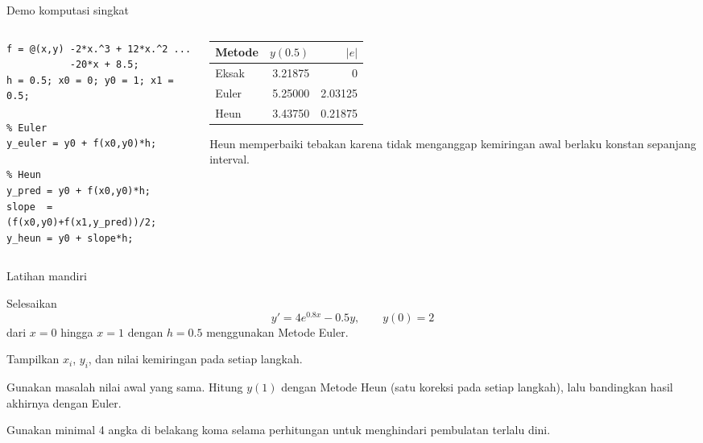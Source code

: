 \documentclass[aspectratio=169,10pt]{beamer}
\begin{document}
\begin{frame}[fragile]{Demo komputasi singkat}
\scriptsize
\begin{columns}[T,totalwidth=\textwidth]
\begin{column}{.55\textwidth}
\begin{lstlisting}[style=matlabstyle]
f = @(x,y) -2*x.^3 + 12*x.^2 ...
           -20*x + 8.5;
h = 0.5; x0 = 0; y0 = 1; x1 = 0.5;

% Euler
y_euler = y0 + f(x0,y0)*h;

% Heun
y_pred = y0 + f(x0,y0)*h;
slope  = (f(x0,y0)+f(x1,y_pred))/2;
y_heun = y0 + slope*h;
\end{lstlisting}
\end{column}
\begin{column}{.41\textwidth}
\begin{bluebox}
\begin{center}
\begin{tabular}{lrr}
\toprule
Metode & $y(0.5)$ & $|e|$\\
\midrule
Eksak & 3.21875 & 0\\
Euler & 5.25000 & 2.03125\\
Heun & 3.43750 & 0.21875\\
\bottomrule
\end{tabular}
\end{center}
\end{bluebox}
\begin{purplebox}[Interpretasi]
Heun memperbaiki tebakan karena tidak menganggap kemiringan awal berlaku konstan sepanjang interval.
\end{purplebox}
\end{column}
\end{columns}
\end{frame}

\begin{frame}{Latihan mandiri}
\scriptsize
\begin{goldbox}
Selesaikan
\[
y'=4e^{0.8x}-0.5y,\qquad y(0)=2
\]
dari $x=0$ hingga $x=1$ dengan $h=0.5$ menggunakan Metode Euler.

Tampilkan $x_i$, $y_i$, dan nilai kemiringan pada setiap langkah.
\end{goldbox}
\vspace{1mm}
\begin{orangebox}
Gunakan masalah nilai awal yang sama. Hitung $y(1)$ dengan Metode Heun
(satu koreksi pada setiap langkah), lalu bandingkan hasil akhirnya dengan Euler.
\end{orangebox}
\vspace{1mm}
\begin{bluebox}[Catatan]
Gunakan minimal 4 angka di belakang koma selama perhitungan untuk menghindari pembulatan terlalu dini.
\end{bluebox}
\end{frame}
\end{document}

